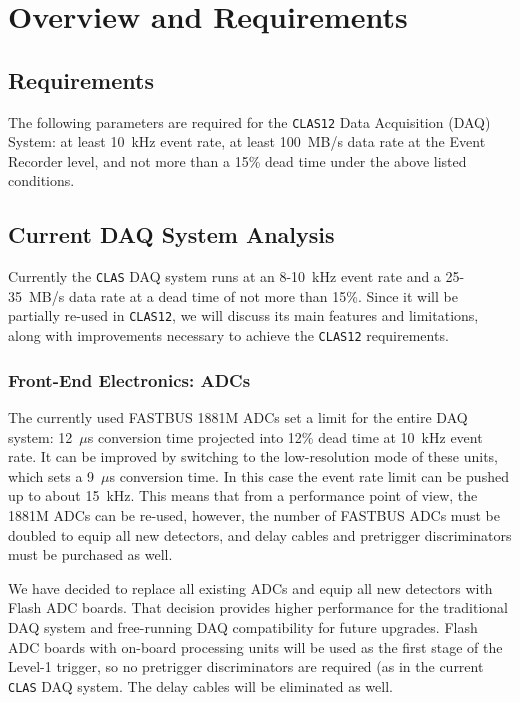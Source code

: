 \section{Overview and Requirements}

\subsection{Requirements}

The following parameters are required for the {\tt CLAS12} Data 
Acquisition (DAQ) System: at least 10~kHz event rate, at least 100~MB/s 
data rate at the Event Recorder level, and not more than a 15\% dead 
time under the above listed conditions.

\subsection{Current DAQ System Analysis}

Currently the {\tt CLAS} DAQ system runs at an 8-10~kHz 
event rate and a 25-35~MB/s data rate at a dead time of not more than 
15\%.  Since it will be partially re-used in {\tt CLAS12}, we will 
discuss its main features and limitations, along with improvements 
necessary to achieve the {\tt CLAS12} requirements.

\subsubsection{Front-End Electronics: ADCs}

The currently used FASTBUS 1881M ADCs set a limit for the entire DAQ 
system: 12~$\mu$s conversion time projected into 12\% dead time at 10~kHz 
event rate.  It can be improved by switching to the low-resolution mode of
these units, which sets a 9~$\mu$s conversion time.  In this case the 
event rate limit can be pushed up to about 15~kHz.  This means that from 
a performance point of view, the 1881M ADCs can be re-used, however, the 
number of FASTBUS ADCs must be doubled to equip all new detectors, and 
delay cables and pretrigger discriminators must be purchased as well.

We have decided to replace all existing ADCs and equip all new detectors with
Flash ADC boards. That decision provides higher performance for the traditional
DAQ system and free-running DAQ compatibility for future upgrades.  Flash ADC
boards with on-board processing units will be used as the first stage of the
Level-1 trigger, so no pretrigger discriminators are required (as in the
current {\tt CLAS} DAQ system.  The delay cables will be eliminated as well.

